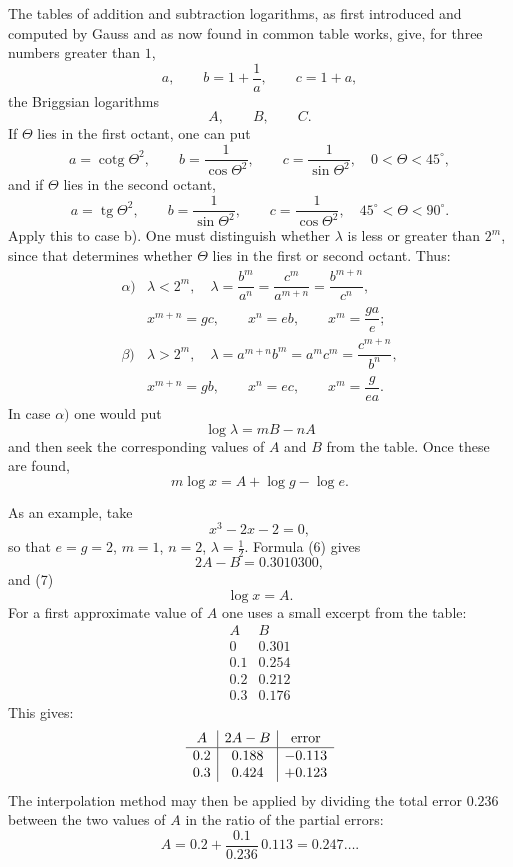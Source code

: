 \documentclass[11pt]{article}
\providecommand{\cotg}{\operatorname{cotg}}
\providecommand{\tg}{\operatorname{tg}}
\begin{document}
The tables of addition and subtraction logarithms, as first introduced and computed by Gauss and as now found in common table works, give, for three numbers greater than $1$,
\[
        a,\qquad b=1+\frac1a,\qquad c=1+a,
\]
the Briggsian logarithms
\[
        A,\qquad B,\qquad C.
\]
If $\Theta$ lies in the first octant, one can put
\begin{equation}
        a=\cotg\Theta^2,\qquad
        b=\frac1{\cos\Theta^2},\qquad
        c=\frac1{\sin\Theta^2},\quad 0<\Theta<45^\circ,
\tag{3}
\end{equation}
and if $\Theta$ lies in the second octant,
\begin{equation}
        a=\tg\Theta^2,\qquad
        b=\frac1{\sin\Theta^2},\qquad
        c=\frac1{\cos\Theta^2},\quad 45^\circ<\Theta<90^\circ.
\tag{4}
\end{equation}
Apply this to case b). One must distinguish whether $\lambda$ is less or greater than $2^m$, since that determines whether $\Theta$ lies in the first or second octant. Thus:
\[
\begin{array}{ll}
\alpha)& \lambda<2^m,\quad
\lambda=\dfrac{b^m}{a^n}=\dfrac{c^m}{a^{m+n}}=\dfrac{b^{m+n}}{c^n},\\[1.0em]
& x^{m+n}=gc,\qquad x^n=eb,\qquad x^m=\dfrac{ga}{e};\\[1.2em]
\beta)& \lambda>2^m,\quad
\lambda=a^{m+n}b^m=a^mc^m=\dfrac{c^{m+n}}{b^n},\\[1.0em]
& x^{m+n}=gb,\qquad x^n=ec,\qquad x^m=\dfrac{g}{ea}.
\end{array}
\tag{5}
\]
In case $\alpha)$ one would put
\begin{equation}
        \log\lambda=mB-nA
\tag{6}
\end{equation}
and then seek the corresponding values of $A$ and $B$ from the table. Once these are found,
\begin{equation}
        m\log x=A+\log g-\log e.
\tag{7}
\end{equation}

As an example, take
\[
        x^3-2x-2=0,
\]
so that $e=g=2$, $m=1$, $n=2$, $\lambda=\tfrac12$. Formula (6) gives
\begin{equation}
        2A-B=0.3010300,
\tag{8}
\end{equation}
and (7)
\begin{equation}
        \log x=A.
\tag{9}
\end{equation}
For a first approximate value of $A$ one uses a small excerpt from the table:
\[
\begin{array}{c|c}
A&B\\ \hline
0&0.301\\
0.1&0.254\\
0.2&0.212\\
0.3&0.176
\end{array}
\]
This gives:
\[
\begin{array}{c|c|c}
A&2A-B&\hbox{error}\\ \hline
0.2&0.188&-0.113\\
0.3&0.424&+0.123
\end{array}
\]
The interpolation method may then be applied by dividing the total error $0.236$ between the two values of $A$ in the ratio of the partial errors:
\[
        A=0.2+\frac{0.1}{0.236}\,0.113=0.247\ldots .
\]
\end{document}
